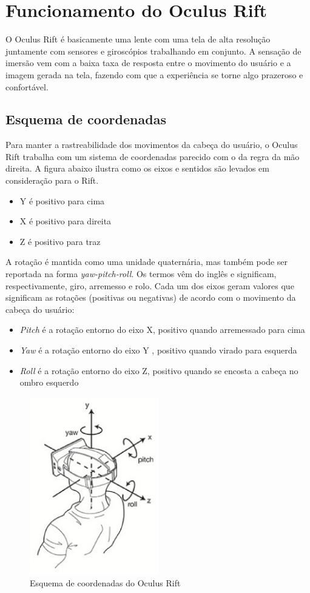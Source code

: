 \section{Funcionamento do Oculus Rift}
O Oculus Rift é basicamente uma lente com uma tela de alta resolução juntamente com sensores e giroscópios trabalhando em conjunto. A sensação de imersão vem com a baixa taxa de resposta entre o movimento do usuário e a imagem gerada na tela, fazendo com que a experiência se torne algo prazeroso e confortável.

\subsection{Esquema de coordenadas}
Para manter a rastreabilidade dos movimentos da cabeça do usuário, o Oculus Rift trabalha com um sistema de coordenadas parecido com o da regra da mão direita. A figura abaixo ilustra como os eixos e sentidos são levados em consideração para o Rift.
\begin{itemize}
  \item Y é positivo para cima
  \item X é positivo para direita
  \item Z é positivo para traz
\end{itemize}
A rotação é mantida como uma unidade quaternária, mas também pode ser reportada na forma \textit{yaw-pitch-roll}. Os termos vêm do inglês e significam, respectivamente, giro, arremesso e rolo. Cada um dos eixos geram valores que significam as rotações (positivas ou negativas) de acordo com o movimento da cabeça do usuário:
\begin{itemize}
  \item \textit{Pitch} é a rotação entorno do eixo X, positivo quando arremessado para cima
  \item \textit{Yaw} é a rotação entorno do eixo Y , positivo quando virado para esquerda
  \item \textit{Roll} é a rotação entorno do eixo Z, positivo quando se encosta a cabeça no ombro esquerdo
\end{itemize}

\begin{figure}[h]
  \centering
  \includegraphics[width=0.5\textwidth]
      {figuras/esquema_coordenadas_rift.eps}
  \caption{Esquema de coordenadas do Oculus Rift}
  \label{coordenadas-rift}
\end{figure}

